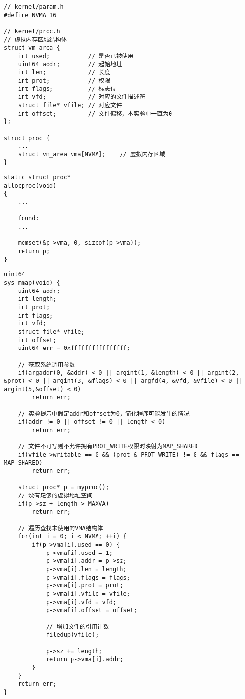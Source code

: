 \begin{listing}[!htb]
	\begin{verbatim}
// kernel/param.h
#define NVMA 16

// kernel/proc.h
// 虚拟内存区域结构体
struct vm_area {
    int used;           // 是否已被使用
    uint64 addr;        // 起始地址
    int len;            // 长度
    int prot;           // 权限
    int flags;          // 标志位
    int vfd;            // 对应的文件描述符
    struct file* vfile; // 对应文件
    int offset;         // 文件偏移，本实验中一直为0
};

struct proc {
    ...
    struct vm_area vma[NVMA];    // 虚拟内存区域
}
	\end{verbatim}
	\caption{创建 vma 结构体并添加到 proc 中}\label{lst:VMA}
\end{listing}

\begin{listing}[!htb]
	\begin{verbatim}
static struct proc*
allocproc(void)
{
    ...

    found:
    ...
    
    memset(&p->vma, 0, sizeof(p->vma));
    return p;
}
	\end{verbatim}
	\caption{在 allocproc 中初始化 vma 数组}\label{lst:memset_allocproc}
\end{listing}

\begin{listing}[!htb]
	\begin{verbatim}
uint64
sys_mmap(void) {
    uint64 addr;
    int length;
    int prot;
    int flags;
    int vfd;
    struct file* vfile;
    int offset;
    uint64 err = 0xffffffffffffffff;

    // 获取系统调用参数
    if(argaddr(0, &addr) < 0 || argint(1, &length) < 0 || argint(2, &prot) < 0 || argint(3, &flags) < 0 || argfd(4, &vfd, &vfile) < 0 || argint(5,&offset) < 0)
        return err;

    // 实验提示中假定addr和offset为0，简化程序可能发生的情况
    if(addr != 0 || offset != 0 || length < 0)
        return err;

    // 文件不可写则不允许拥有PROT_WRITE权限时映射为MAP_SHARED
    if(vfile->writable == 0 && (prot & PROT_WRITE) != 0 && flags == MAP_SHARED)
        return err;
        
    struct proc* p = myproc();
    // 没有足够的虚拟地址空间
    if(p->sz + length > MAXVA)
        return err;

    // 遍历查找未使用的VMA结构体
    for(int i = 0; i < NVMA; ++i) {
        if(p->vma[i].used == 0) {
            p->vma[i].used = 1;
            p->vma[i].addr = p->sz;
            p->vma[i].len = length;
            p->vma[i].flags = flags;
            p->vma[i].prot = prot;
            p->vma[i].vfile = vfile;
            p->vma[i].vfd = vfd;
            p->vma[i].offset = offset;

            // 增加文件的引用计数
            filedup(vfile);

            p->sz += length;
            return p->vma[i].addr;
        }
    }
    return err;
}
	\end{verbatim}
	\caption{实现 sys\_mmap}\label{lst:sys_mmap}
\end{listing}

